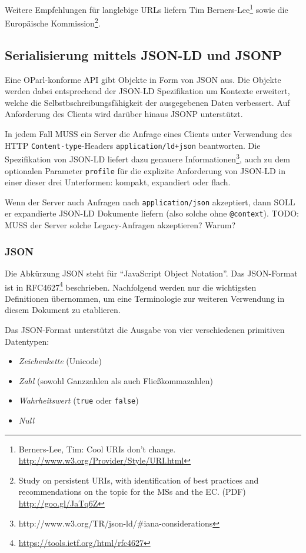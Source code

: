 \documentclass[,a4paper]{article}
\begin{document}
Weitere Empfehlungen für langlebige URLs liefern Tim
Berners-Lee\footnote{Berners-Lee, Tim: Cool URIs don't change.
  \url{http://www.w3.org/Provider/Style/URI.html}} sowie die Europäische
Kommission\footnote{Study on persistent URIs, with identification of
  best practices and recommendations on the topic for the MSs and the
  EC. (PDF) \url{http://goo.gl/JaTq6Z}}.

\subsection{Serialisierung mittels JSON-LD und
JSONP}\label{serialisierung-mittels-json-ld-und-jsonp}

Eine OParl-konforme API gibt Objekte in Form von JSON aus. Die Objekte
werden dabei entsprechend der JSON-LD Spezifikation um Kontexte
erweitert, welche die Selbstbschreibungsfähigkeit der ausgegebenen Daten
verbessert. Auf Anforderung des Clients wird darüber hinaus JSONP
unterstützt.

In jedem Fall MUSS ein Server die Anfrage eines Clients unter Verwendung
des HTTP \texttt{Content-type}-Headers \texttt{application/ld+json}
beantworten. Die Spezifikation von JSON-LD liefert dazu genauere
Informationen\footnote{http://www.w3.org/TR/json-ld/\#iana-considerations},
auch zu dem optionalen Parameter \texttt{profile} für die explizite
Anforderung von JSON-LD in einer dieser drei Unterformen: kompakt,
expandiert oder flach.

Wenn der Server auch Anfragen nach \texttt{application/json} akzeptiert,
dann SOLL er expandierte JSON-LD Dokumente liefern (also solche ohne
\texttt{@context}). TODO: MUSS der Server solche Legacy-Anfragen
akzeptieren? Warum?

\subsubsection{JSON}\label{json}

Die Abkürzung JSON steht für ``JavaScript Object Notation''. Das
JSON-Format ist in RFC4627\footnote{\url{https://tools.ietf.org/html/rfc4627}}
beschrieben. Nachfolgend werden nur die wichtigsten Definitionen
übernommen, um eine Terminologie zur weiteren Verwendung in diesem
Dokument zu etablieren.

Das JSON-Format unterstützt die Ausgabe von vier verschiedenen
primitiven Datentypen:

\begin{itemize}
\itemsep1pt\parskip0pt
\item
  \emph{Zeichenkette} (Unicode)
\item
  \emph{Zahl} (sowohl Ganzzahlen als auch Fließkommazahlen)
\item
  \emph{Wahrheitswert} (\texttt{true} oder \texttt{false})
\item
  \emph{Null}
\end{itemize}
\end{document}
